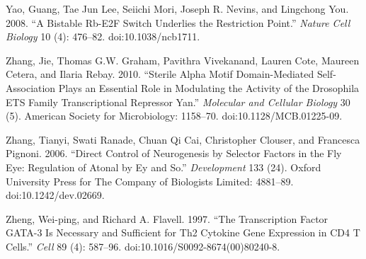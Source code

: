 Yao, Guang, Tae Jun Lee, Seiichi Mori, Joseph R. Nevins, and Lingchong You. 2008. ``A Bistable Rb-E2F Switch Underlies the Restriction Point.'' \emph{Nature Cell Biology} 10 (4): 476--82. doi:10.1038/ncb1711.

Zhang, Jie, Thomas G.W. Graham, Pavithra Vivekanand, Lauren Cote, Maureen Cetera, and Ilaria Rebay. 2010. ``Sterile Alpha Motif Domain-Mediated Self-Association Plays an Essential Role in Modulating the Activity of the Drosophila ETS Family Transcriptional Repressor Yan.'' \emph{Molecular and Cellular Biology} 30 (5). American Society for Microbiology: 1158--70. doi:10.1128/MCB.01225-09.

Zhang, Tianyi, Swati Ranade, Chuan Qi Cai, Christopher Clouser, and Francesca Pignoni. 2006. ``Direct Control of Neurogenesis by Selector Factors in the Fly Eye: Regulation of Atonal by Ey and So.'' \emph{Development} 133 (24). Oxford University Press for The Company of Biologists Limited: 4881--89. doi:10.1242/dev.02669.

Zheng, Wei-ping, and Richard A. Flavell. 1997. ``The Transcription Factor GATA-3 Is Necessary and Sufficient for Th2 Cytokine Gene Expression in CD4 T Cells.'' \emph{Cell} 89 (4): 587--96. doi:10.1016/S0092-8674(00)80240-8.
